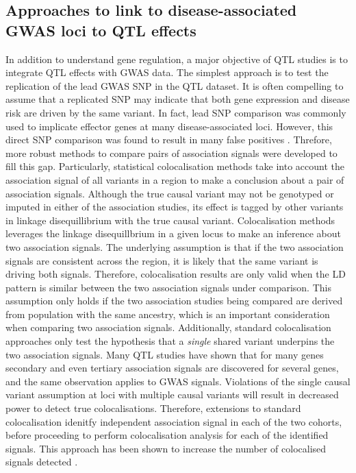 \subsection{Approaches to link to disease-associated GWAS loci to QTL effects}
In addition to understand gene regulation, a major objective of QTL studies is to integrate QTL effects with GWAS data. The simplest approach is to test the replication of the lead GWAS SNP in the QTL dataset. It is often compelling to assume that a replicated SNP may indicate that both gene expression and disease risk are driven by the same variant. In fact, lead SNP comparison was commonly used to implicate effector genes at many disease-associated loci. However, this direct SNP comparison was found to result in many false positives \cite{Liu2019-fv}. Threfore, more robust methods to compare pairs of association signals were developed to fill this gap. Particularly, statistical colocalisation methods take into account the association signal of all variants in a region to make a conclusion about a pair of association signals. Although the true causal variant may not be genotyped or imputed in either of the association studies, its effect is tagged by other variants in linkage disequillibrium with the true causal variant. Colocalisation methods leverages the linkage disequillbrium in a given locus to make an inference about two association signals. The underlying assumption is that if the two association signals are consistent across the region, it is likely that the same variant is driving both signals. Therefore, colocalisation results are only valid when the LD pattern is similar between the two association signals under comparison. This assumption only holds if the two association studies being compared are derived from population with the same ancestry, which is an important consideration when comparing two association signals. Additionally, standard colocalisation approaches only test the hypothesis that a \textit{single} shared variant underpins the two association signals. Many QTL studies have shown that for many genes secondary and even tertiary association signals are discovered for several genes, and the same observation applies to GWAS signals. Violations of the single causal variant assumption at loci with multiple causal variants will result in decreased power to detect true colocalisations. Therefore, extensions to standard colocalisation idenitfy independent association signal in each of the two cohorts, before proceeding to perform colocalisation analysis for each of the identified signals. This approach has been shown to increase the number of colocalised signals detected \cite{Wallace2021-rv}.\\  



